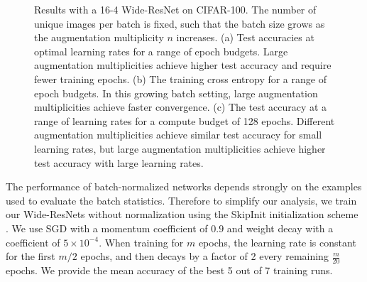 \documentclass{article}
\begin{document}
\begin{figure}[t]
\centering
  \vskip -3mm
  \vskip -2.5mm
\caption{Results with a 16-4 Wide-ResNet on CIFAR-100. The number of unique images per batch is fixed, such that the batch size grows as the augmentation multiplicity $n$ increases. (a) Test accuracies at optimal learning rates for a range of epoch budgets. Large augmentation multiplicities achieve higher test accuracy and require fewer training epochs. (b) The training cross entropy for a range of epoch budgets.
In this growing batch setting, large augmentation multiplicities achieve faster convergence. (c) The test accuracy at a range of learning rates for a compute budget of 128 epochs. Different augmentation multiplicities achieve similar test accuracy for small learning rates, but large augmentation multiplicities achieve higher test accuracy with large learning rates.
}
  \vskip -2.5mm
\label{fig:growing_cifar}
\end{figure}

The performance of batch-normalized networks depends strongly on the examples used to evaluate the batch statistics. Therefore to simplify our analysis, we train our Wide-ResNets without normalization using the SkipInit initialization scheme \citep{de2020batch}. We use SGD with a momentum coefficient of $0.9$ and weight decay with a coefficient of $5\times 10^{-4}$. When training for $m$ epochs, the learning rate is constant for the first $m/2$ epochs, and then decays by a factor of 2 every remaining $\frac{m}{20}$ epochs. We provide the mean accuracy of the best 5 out of 7 training runs. 
\end{document}
